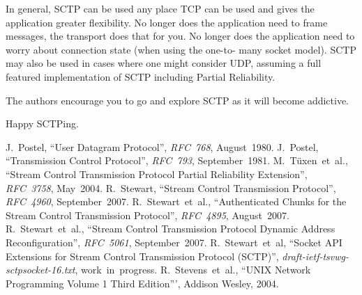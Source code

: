 \documentclass[conference]{IEEEtran}
\begin{document}
In general, SCTP can be used any place TCP can be used
and gives the application greater flexibility. No longer
does the application need to frame messages, the transport
does that for you. No longer does the application need
to worry about connection state (when using the one-to-
many socket model). SCTP may also be used in cases where
one might consider UDP, assuming a full featured implementation
of SCTP including Partial Reliability. 

The authors encourage you to go and explore SCTP as it will
become addictive.

Happy SCTPing.

%
%
%

\begin{thebibliography}{9}
  J.~Postel,
  ``User Datagram Protocol'',
  \textit{RFC~768},
  August~1980.
  J.~Postel,
  ``Transmission Control Protocol'',
  \textit{RFC~793},
  September~1981.
  M.~T\"uxen~et~al.,
  ``Stream Control Transmission Protocol Partial Reliability Extension'',
  \textit{RFC~3758},
  May~2004.
  R.~Stewart,
  ``Stream Control Transmission Protocol'',
  \textit{RFC~4960},
  September~2007.
  R.~Stewart~et~al.,
  ``Authenticated Chunks for the Stream Control Transmission Protocol'',
  \textit{RFC~4895},
  August~2007.
  R.~Stewart~et~al.,
  ``Stream Control Transmission Protocol Dynamic Address Reconfiguration'',
  \textit{RFC~5061},
  September~2007.
  R.~Stewart~et~al,
  ``Socket API Extensions for Stream Control Transmission Protocol (SCTP)'',
  \textit{draft-ietf-tsvwg-sctpsocket-16.txt}, work~in~progress.
  R.~Stevens~et~al.,
  ``UNIX Network Programming Volume 1 Third Edition''', Addison Wesley, 2004.
\end{thebibliography}

\end{document}
